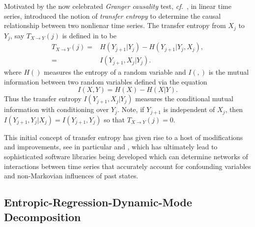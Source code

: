 \documentclass[a4paper,11pt]{article}
\newcommand{\cf}{{\it cf.}~}
\begin{document}
Motivated by the now celebrated {\it Granger causality} test, \cf \cite{granger}, in linear time series, \cite{schreiber} introduced the notion of {\it transfer entropy} to determine the causal relationship between two nonlienar time series.  The transfer entropy from $X_{j}$ to $Y_{j}$, say $T_{X\rightarrow Y}(j)$ is defined in \cite{schreiber} to be 
\begin{align}
T_{X\rightarrow Y}(j) = & H\left(Y_{j+1}|Y_{j}\right) - H\left(Y_{j+1}|Y_{j}, X_{j}\right),  \\
= & I\left(Y_{j+1}, X_{j}|Y_{j} \right).
\end{align}
where $H()$ measures the entropy of a random variable and $I(,)$ is the mutual information between two random variables defined via the equation
\begin{equation}
I(X,Y) = H(X) - H(X|Y).  
\end{equation}
Thus the transfer entropy $I(Y_{j+1},X_{j}|Y_{j})$ measures the conditional mutual information with conditioning over $Y_{j}$.  Note, if $Y_{j+1}$ is independent of $X_{j}$, then $I(Y_{j+1},Y_{j}|X_{j}) = I(Y_{j+1},Y_{j})$ so that $T_{X\rightarrow Y}(j) = 0$.  

This initial concept of transfer entropy has given rise to a host of modifications and improvements, see in particular \cite{faes} and \cite{bollt}, which has ultimately lead to sophisticated software libraries being developed which can determine networks of interactions between time series that accurately account for confounding variables and non-Markovian influences of past states.  

\subsection{Entropic-Regression-Dynamic-Mode Decomposition}
\end{document}
